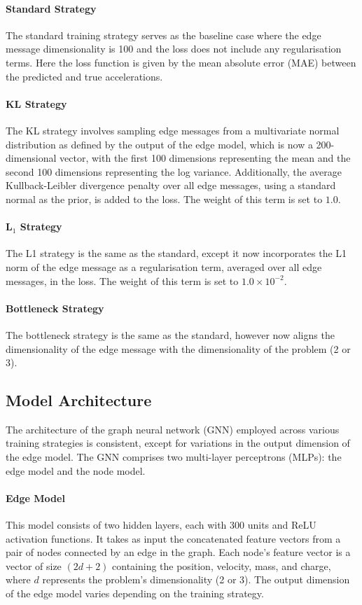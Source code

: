\documentclass[11pt]{article}
\begin{document}
\paragraph*{Standard Strategy}
The standard training strategy serves as the baseline case where the edge message dimensionality is 100 and the loss does not include any regularisation terms. Here the loss function is given by the mean absolute error (MAE) between the predicted and true accelerations.

\paragraph*{KL Strategy}
The KL strategy involves sampling edge messages from a multivariate normal distribution as defined by the output of the edge model, which is now a 200-dimensional vector, with the first 100 dimensions representing the mean and the second 100 dimensions representing the log variance. Additionally, the average Kullback-Leibler divergence penalty over all edge messages, using a standard normal as the prior, is added to the loss. The weight of this term is set to \(1.0 \).

\paragraph*{L$_1$ Strategy}
The L1 strategy is the same as the standard, except it now incorporates the L1 norm of the edge message as a regularisation term, averaged over all edge messages, in the loss. The weight of this term is set to \(1.0 \times 10^{-2}\).

\paragraph*{Bottleneck Strategy}
The bottleneck strategy is the same as the standard, however now aligns the dimensionality of the edge message with the dimensionality of the problem (2 or 3).

\subsection{Model Architecture}
The architecture of the graph neural network (GNN) employed across various training strategies is consistent, except for variations in the output dimension of the edge model. The GNN comprises two multi-layer perceptrons (MLPs): the edge model and the node model.

\paragraph*{Edge Model} This model consists of two hidden layers, each with 300 units and ReLU activation functions. It takes as input the concatenated feature vectors from a pair of nodes connected by an edge in the graph. Each node's feature vector is a vector of size $(2d+2)$ containing the position, velocity, mass, and charge, where $d$ represents the problem's dimensionality (2 or 3). The output dimension of the edge model varies depending on the training strategy.
\end{document}

